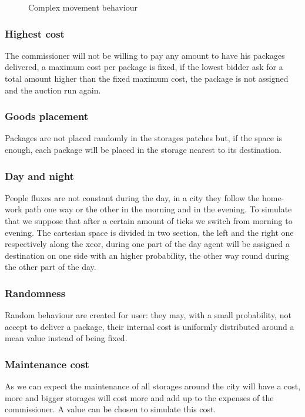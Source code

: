 \documentclass[11pt,a4paper]{article}
\begin{document}
\begin{figure}[h!]
\centering
\caption{Complex movement behaviour}
\end{figure}
\medskip
\subsubsection*{Highest cost}
The commissioner will not be willing to pay any amount to have his packages delivered, a maximum cost per package is fixed, if the lowest bidder ask for a total amount higher than the fixed maximum cost, the package is not assigned and the auction run again.
\medskip
\subsubsection*{Goods placement}
Packages are not placed randomly in the storages patches but, if the space is enough, each package will be placed in the storage nearest to its destination.

\begin{figure}[h!]
\centering
\end{figure}
\newpage
\subsubsection*{Day and night}
People fluxes are not constant during the day, in a city they follow the home-work path one way or the other in the morning and in the evening.
To simulate that we suppose that after a certain amount of ticks we switch from morning to evening.
The cartesian space is divided in two section, the left and the right one respectively along the xcor, during one part of the day agent will be assigned a destination on one side with an higher probability, the other way round during the other part of the day.

\begin{figure}[h!]
\centering
\end{figure}

\subsubsection*{Randomness}
Random behaviour are created for user: they may, with a small probability, not accept to deliver a package, their internal cost is uniformly distributed around a mean value instead of being fixed.

\subsubsection*{Maintenance cost}
As we can expect the maintenance of all storages around the city will have a cost, more and bigger storages will cost more and add up to the expenses of the commissioner. A value can be chosen to simulate this cost.
\end{document}
